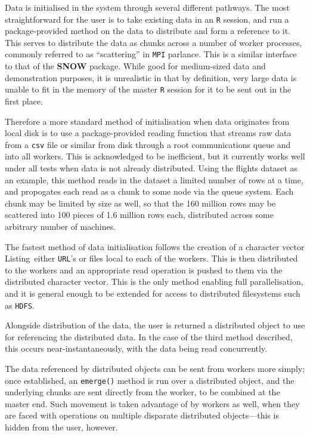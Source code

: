 Data is initialised in the system through several different pathways.
The most straightforward for the user is to take existing data in an \texttt{R} session, and run a package-provided method on the data to distribute and form a reference to it.
This serves to distribute the data as chunks across a number of worker processes, commonly referred to as ``scattering'' in \texttt{MPI} parlance\cite{walker1996mpi}.
This is a similar interface to that of the \textbf{SNOW} package\cite{tierney18}.
While good for medium-sized data and demonstration purposes, it is unrealistic in that by definition, very large data is unable to fit in the memory of the master \texttt{R} session for it to be sent out in the first place.

Therefore a more standard method of initialisation when data originates from local disk is to use a package-provided reading function that streams raw data from a \texttt{csv} file or similar from disk through a root communications queue and into all workers.
This is acknowledged to be inefficient, but it currently works well under all tests when data is not already distributed.
Using the flights dataset as an example, this method reads in the dataset a limited number of rows at a time, and propogates each read as a chunk to some node via the queue system.
Each chunk may be limited by size as well, so that the 160 million rows may be scattered into 100 pieces of 1.6 million rows each, distributed across some arbitrary number of machines.

The fastest method of data initialisation follows the creation of a character vector Listing~either \texttt{URL}'s or files local to each of the workers.
This is then distributed to the workers and an appropriate read operation is pushed to them via the distributed character vector.
This is the only method enabling full parallelisation, and it is general enough to be extended for access to distributed filesystems such as \texttt{HDFS}.

Alongside distribution of the data, the user is returned a distributed object to use for referencing the distributed data.
In the case of the third method described, this occurs near-instantaneously, with the data being read concurrently.

The data referenced by distributed objects can be sent from workers more simply; once established, an \texttt{emerge()} method is run over a distributed object, and the underlying chunks are sent directly from the worker, to be combined at the master end.
Such movement is taken advantage of by workers as well, when they are faced with operations on multiple disparate distributed objects---this is hidden from the user, however.

